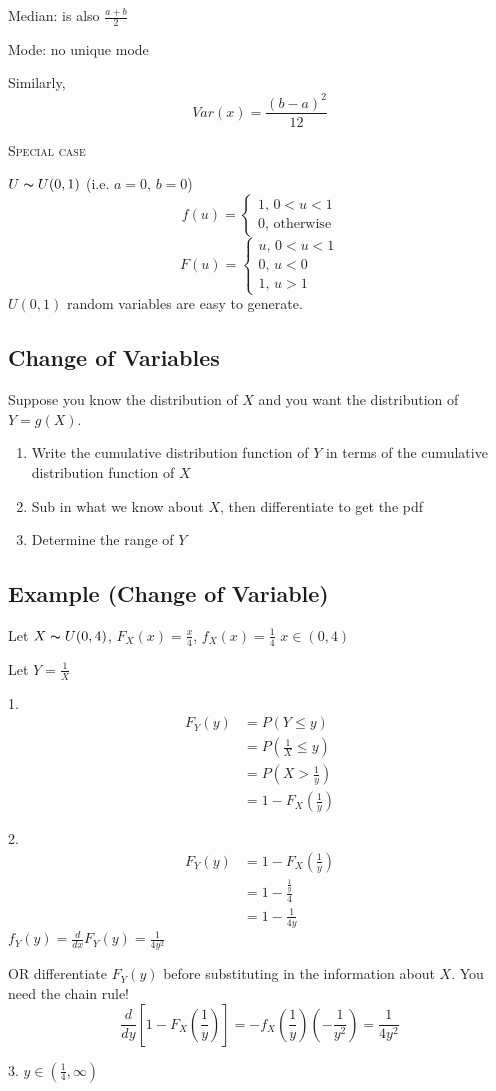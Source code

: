 Median: is also $ \frac{a+b}{2} $

Mode: no unique mode

Similarly,
\[ Var(x)=\frac{(b-a)^2}{12} \]

\textsc{Special case}

$ U \thicksim U(0,1) $ (i.e. $ a=0,\,b=0 $)
\[ f(u)=
\begin{cases}
    1,\,0<u<1\\
    0,\,\text{otherwise}
\end{cases} \]
\[ F(u)=
\begin{cases}
    u,\,0<u<1\\
    0,\,u<0\\
    1,\,u>1
\end{cases} \]
$ U(0,1) $ random variables are easy to generate.

\subsection{Change of Variables}
Suppose you know the distribution of $ X $ and you want the distribution of
$ Y=g(X) $.
\begin{enumerate}[1.]
    \item Write the cumulative distribution function of $ Y $ in terms of the cumulative distribution function of $ X $
    \item Sub in what we know about $ X $, then differentiate to get the pdf
    \item Determine the range of $ Y $
\end{enumerate}
\subsection{Example (Change of Variable)}
Let $ X \thicksim U(0,4) $, $ F_X(x)=\frac{x}{4} $, $ f_X(x)=\frac{1}{4} $ 
$ x\in(0,4) $

Let $ Y=\frac{1}{X} $

1.
\begin{align*}
    F_Y(y)&=P\left(Y\le y\right)\\
    &=P\left(\frac{1}{X} \le y\right)\\
    &=P\left(X>\frac{1}{y}\right)\\
    &=1-F_X\left(\frac{1}{y}\right)
\end{align*}

2.
\begin{align*}
    F_Y(y)&=1-F_X\left(\frac{1}{y}\right)\\
    &=1-\frac{\frac{1}{y}}{4}\\
    &=1-\frac{1}{4y}
\end{align*}
$ f_Y(y)=\frac{d}{dx}F_Y(y)=\frac{1}{4y^2} $

OR differentiate $ F_Y(y) $ before
substituting in the information about $ X $. You need the chain rule!
\[ \frac{d}{dy}\left[1-F_X\left(\frac{1}{y}\right)\right]=
-f_X\left(\frac{1}{y}\right)\left(-\frac{1}{y^2}\right)=\frac{1}{4y^2} \]

3. $ y\in(\frac{1}{4},\infty) $

